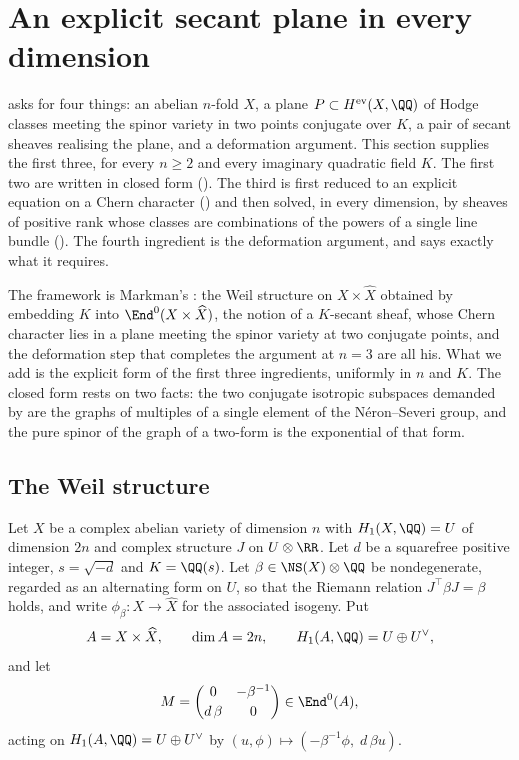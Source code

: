 \section{An explicit secant plane in every dimension}\label{sec:construction}

 asks for four things: an abelian $n$-fold $X$, a plane
$P\subset H^{\mathrm{ev}}(X,\QQ)$ of Hodge classes meeting the spinor variety
in two points conjugate over $K$, a pair of secant sheaves realising the
plane, and a deformation argument. This section supplies the first three, for
every $n\ge2$ and every imaginary quadratic field $K$. The first two are
written in closed form (). The third is first
reduced to an explicit equation on a Chern character
() and then solved, in every dimension, by sheaves
of positive rank whose classes are combinations of the powers of a single line
bundle (). The fourth ingredient is the deformation
argument, and  says exactly what it requires.

The framework is Markman's \cite{Mar25a,Mar25b}: the Weil structure on
$X\times\widehat{X}$ obtained by embedding $K$ into
$\End^{0}(X\times\widehat{X})$, the notion of a $K$-secant sheaf, whose Chern
character lies in a plane meeting the spinor variety at two conjugate points,
and the deformation step that completes the argument at $n=3$ are all his.
What we add is the explicit form of the first three ingredients, uniformly in
$n$ and $K$. The closed form rests on two facts: the two conjugate isotropic
subspaces demanded by  are the graphs of multiples of
a single element of the N\'eron--Severi group, and the pure spinor of the graph
of a two-form is the exponential of that form.

\subsection{The Weil structure}

\begin{setupenv}\label{setup:construction}
Let $X$ be a complex abelian variety of dimension $n$ with
$H_{1}(X,\QQ)=U$ of dimension $2n$ and complex structure $J$ on
$U\otimes\RR$. Let $d$ be a squarefree positive integer, $s=\sqrt{-d}$ and
$K=\QQ(s)$. Let $\beta\in\NS(X)\otimes\QQ$ be nondegenerate, regarded as an
alternating form on $U$, so that the Riemann relation $J^{\top}\beta J=\beta$
holds, and write $\phi_{\beta}\colon X\to\widehat{X}$ for the associated
isogeny. Put
\[
  A=X\times\widehat{X},\qquad \dim A=2n,\qquad
  H_{1}(A,\QQ)=U\oplus U^{\vee},
\]
and let
\begin{equation}\label{eq:Mdef}
  M=\begin{pmatrix}0 & -\beta^{-1}\\[2pt] d\,\beta & 0\end{pmatrix}
  \in\End^{0}(A),
\end{equation}
acting on $H_{1}(A,\QQ)=U\oplus U^{\vee}$ by
$(u,\phi)\mapsto(-\beta^{-1}\phi,\;d\,\beta u)$.
\end{setupenv}

